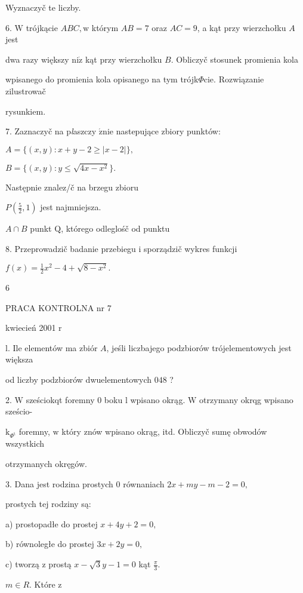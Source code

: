 \documentclass[a4paper,12pt]{article}
\begin{document}
Wyznaczyč te liczby.

6. $\mathrm{W}$ trójkącie $ABC, \mathrm{w}$ którym $AB=7$ oraz $AC=9$, a kąt przy wierzchołku $A$ jest

dwa razy większy $\mathrm{n}\mathrm{i}\dot{\mathrm{z}}$ kąt przy wierzchołku $B$. Obliczyč stosunek promienia kola

wpisanego do promienia kola opisanego na tym trójk$\Phi$cie. Rozwiązanie zilustrowač

rysunkiem.

7. Zaznaczyč na p{\it l}aszczy $\acute{\mathrm{z}}\mathrm{n}\mathrm{i}\mathrm{e}$ nastepujące zbiory punktów:

$A=\{(x,y):x+y-2\geq|x-2|\},$

$B=\{(x,y):y\leq\sqrt{4x-x^{2}}\}.$

Następnie znalez/č na brzegu zbioru

$P(\displaystyle \frac{5}{2},1)$ jest najmniejsza.

$A\cap B$ punkt $\mathrm{Q}$, którego odleglośč od punktu

8. Przeprowadzič badanie przebiegu i sporządzič wykres funkcji

$f(x)=\displaystyle \frac{1}{2}x^{2}-4+\sqrt{8-x^{2}}.$

6





PRACA KONTROLNA nr 7

kwiecień 2001 $\mathrm{r}$

l. Ile elementów ma zbiór $A$, jeśli liczbajego podzbiorów trójelementowych jest większa

od liczby podzbiorów dwuelementowych $048$ ?

2. $\mathrm{W}$ sześciokqt foremny $0$ boku l wpisano okrąg. $\mathrm{W}$ otrzymany okrqg wpisano sześcio-

$\mathrm{k}_{\Phi^{\mathrm{t}}}$ foremny, $\mathrm{w}$ który znów wpisano okrąg, itd. Obliczyč sumę obwodów wszystkich

otrzymanych okręgów.

3. Dana jest rodzina prostych $0$ równaniach $2x+my-m-2=0,$

prostych tej rodziny są:

a) prostopadłe do prostej $x+4y+2=0,$

b) równoległe do prostej $3x+2y=0,$

c) tworzą $\mathrm{z}$ prostą $x-\sqrt{3}y-1=0$ kąt $\displaystyle \frac{\pi}{3}.$

$m\in R$. Które $\mathrm{z}$
\end{document}
